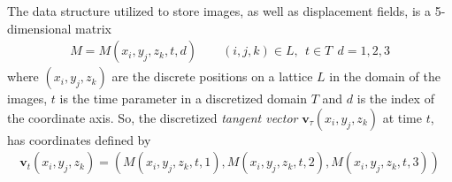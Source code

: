 The data structure utilized to store images, as well as displacement fields, is a 5-dimensional matrix
\begin{align}\label{eq:basic_data_structure}
M = M(x_i,y_j,z_k,t,d) \qquad (i,j,k)\in L , ~~ t \in T  ~~ d = 1,2,3
\end{align}
where $(x_i,y_j,z_k)$ are the discrete positions on a lattice $L$ in the domain of the images, $t$ is the time parameter in a discretized domain $T$ and $d$ is the index of the coordinate axis. So, the discretized \emph{tangent vector} $\mathbf{v}_{\tau}(x_i,y_j,z_k)$ at time $t$, has coordinates defined by
\begin{align*}
\mathbf{v}_{t}(x_i,y_j,z_k) = (M(x_i,y_j,z_k,t ,1), M(x_i,y_j,z_k,t,2), M(x_i,y_j,z_k,t ,3))
\end{align*}


